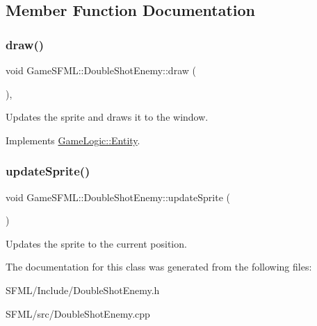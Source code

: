 \subsection{Member Function Documentation}
\mbox{\label{classGameSFML_1_1DoubleShotEnemy_a3d30aebbab50ad019207d6ba91ab0b5f}} 
\subsubsection{\texorpdfstring{draw()}{draw()}}
{\footnotesize\ttfamily void Game\+S\+F\+M\+L\+::\+Double\+Shot\+Enemy\+::draw (\begin{DoxyParamCaption}{ }\end{DoxyParamCaption})\hspace{0.3cm}{\ttfamily [override]}, {\ttfamily [virtual]}}

Updates the sprite and draws it to the window. 

Implements \hyperlink{classGameLogic_1_1Entity_adf23a7036cb99dfc6e33434018131da4}{Game\+Logic\+::\+Entity}.

\mbox{\label{classGameSFML_1_1DoubleShotEnemy_a9f93afa5fb33282829667f49f4fc48b9}} 
\subsubsection{\texorpdfstring{update\+Sprite()}{updateSprite()}}
{\footnotesize\ttfamily void Game\+S\+F\+M\+L\+::\+Double\+Shot\+Enemy\+::update\+Sprite (\begin{DoxyParamCaption}{ }\end{DoxyParamCaption})}

Updates the sprite to the current position. 

The documentation for this class was generated from the following files\+:\begin{DoxyCompactItemize}
\item 
S\+F\+M\+L/\+Include/Double\+Shot\+Enemy.\+h\item 
S\+F\+M\+L/src/Double\+Shot\+Enemy.\+cpp\end{DoxyCompactItemize}
